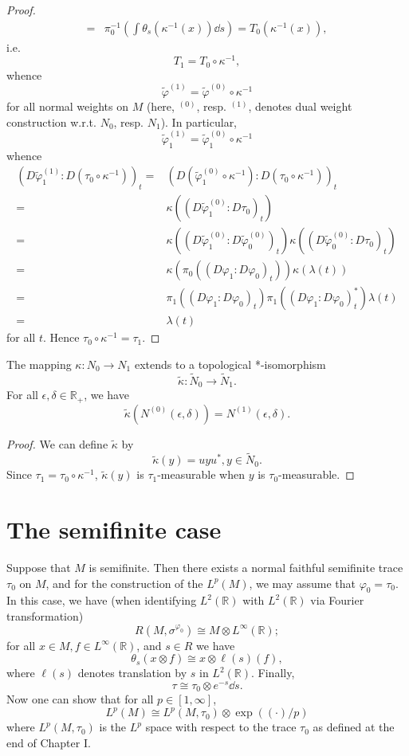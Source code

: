 \begin{proof}
\[\begin{split}
            =&\pi_0^{-1}(\int \theta_s (\kappa^{-1}(x))\dd s)=T_0(\kappa^{-1}(x)),
        \end{split}
    \]
    i.e.
    \[
        T_1=T_0\circ \kappa^{-1},
    \]
    whence
    \[
        \tilde{\varphi}^{(1)}= \tilde{\varphi}^{(0)}\circ\kappa^{-1}
    \]
    for all normal weights on $M$ (here, $^{(0)}$, resp. $^{(1)}$, denotes dual weight construction w.r.t. $N_0$, resp. $N_1$). In particular,
    \[
        \tilde{\varphi}_1^{(1)}= \tilde{\varphi}_1^{(0)}\circ\kappa^{-1}
    \]
    whence
    \[
        \begin{split}
            (D\tilde{\varphi}_1^{(1)}:D(\tau_0\circ\kappa^{-1}))_t=&(D(\tilde{\varphi}_1^{(0)}\circ\kappa^{-1}):D(\tau_0\circ\kappa^{-1}))_t\\
            =&\kappa((D\tilde{\varphi}_1^{(0)}:D\tau_0)_t)\\
            =&\kappa((D\tilde{\varphi}_1^{(0)}:D\tilde{\varphi}_0^{(0)})_t)\kappa((D\tilde{\varphi}_0^{(0)}:D\tau_0)_t)\\
            =&\kappa(\pi_0((D\varphi_1:D\varphi_0)_t))\kappa(\lambda(t))\\
            =&\pi_1((D\varphi_1:D\varphi_0)_t)\pi_1((D\varphi_1:D\varphi_0)_t^*)\lambda(t)\\
            =&\lambda(t)
        \end{split}
    \]
    for all $t$. Hence $\tau_0\circ \kappa^{-1}=\tau_1$.
\end{proof}
\begin{corollary}
    The mapping $\kappa: N_0\to N_1$ extends to a topological *-isomorphism
    \[
        \tilde{\kappa}:\tilde{N}_0\to \tilde{N}_1.
    \]
    For all $\epsilon,\delta\in \mathbb{R}_+$, we have
    \[
        \tilde{\kappa}(N^{(0)}(\epsilon,\delta))=N^{(1)}(\epsilon,\delta).
    \]
\end{corollary}
\begin{proof}
    We can define $\tilde{\kappa}$ by
    \[
        \tilde{\kappa}(y)=uyu^*,y\in \tilde{N}_0.
    \]
    Since $\tau_1=\tau_0\circ \kappa^{-1}$, $\tilde{\kappa}(y)$ is $\tau_1$-measurable when $y$ is $\tau_0$-measurable.
\end{proof}
\section{The semifinite case}
Suppose that $M$ is semifinite. Then there exists a normal faithful semifinite trace $\tau_0$ on $M$, and for the construction of the $L^p(M)$, we may assume that $\varphi_0=\tau_0$. In this case, we have (when identifying $L^2(\mathbb{R})$ with $L^2(\mathbb{R})$ via Fourier transformation)
\[
    R(M,\sigma^{\varphi_0})\cong M\otimes L^\infty(\mathbb{R});
\]
for all $x\in M , f\in L^\infty(\mathbb{R})$, and $s\in R$ we have
\[
    \theta_s(x\otimes f)\cong x\otimes \ell(s)(f),
\]
where $\ell(s)$ denotes translation by $s$ in $L^2(\mathbb{R})$. Finally,
\[
    \tau\cong \tau_0\otimes e^{-s}\dd s.
\]
Now one can show that for all $p\in [1,\infty]$,
\[
    L^p(M)\cong L^p(M,\tau_0)\otimes \exp((\cdot)/p)
\]
where $L^p(M,\tau_0)$ is the $L^p$ space with respect to the trace $\tau_0$ as defined at the end of Chapter I.
% 